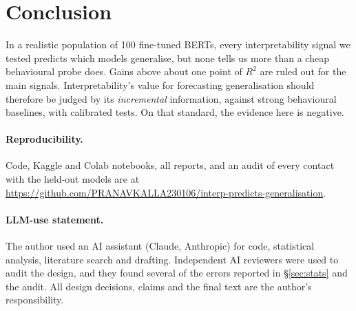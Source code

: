 \documentclass[10pt]{article}
\begin{document}
\section{Conclusion}
In a realistic population of 100 fine-tuned BERTs, every interpretability signal we tested predicts which models generalise, but none tells us more than a cheap behavioural probe does. Gains above about one point of $R^2$ are ruled out for the main signals. Interpretability's value for forecasting generalisation should therefore be judged by its \emph{incremental} information, against strong behavioural baselines, with calibrated tests. On that standard, the evidence here is negative.

\paragraph{Reproducibility.} Code, Kaggle and Colab notebooks, all reports, and an audit of every contact with the held-out models are at \url{https://github.com/PRANAVKALLA230106/interp-predicts-generalisation}.

\paragraph{LLM-use statement.} The author used an AI assistant (Claude, Anthropic) for code, statistical analysis, literature search and drafting. Independent AI reviewers were used to audit the design, and they found several of the errors reported in \S\ref{sec:stats} and the audit. All design decisions, claims and the final text are the author's responsibility.
\end{document}
